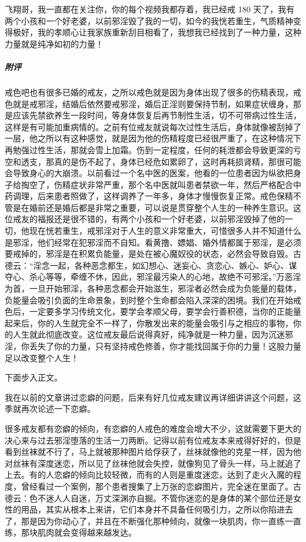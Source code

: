 \begin{case}
    飞翔哥，我一直都在关注你，你的每个视频我都存着，我已经戒 180 天了，我有两个小孩和一个好老婆，以前邪淫毁了我的一切，如今的我恍若重生，气质精神变得极好，我的孝顺心让我家族重新刮目相看了，我想我已经找到了一种力量，这种力量就是纯净如初的力量！
    \subparagraph{附评} 戒色吧也有很多已婚的戒友，之所以戒色就是因为身体出现了很多的伤精表现，戒色就是戒邪淫，结婚后依然要戒邪淫，婚后正淫则要保持节制，如果症状缠身，那是应该先禁欲养生一段时间，等身体恢复后再节制性生活，切不可带病过性生活，这样是有可能加重病情的。之前有位戒友就说每次过性生活后，身体就像被刮掉了一层，他之所以有这种感觉，就是因为他的伤精程度已经很严重了，在这种情况下再勉强过性生活，那就会雪上加霜。伤到一定程度，任何的耗泄都会导致更深的亏空和透支，那真的是伤不起了，身体已经危如累卵了，这时再耗损肾精，那很可能会导致身心的大崩溃。以前看过一个名中医的医案，他看的一位患者因为纵欲把身子给掏空了，伤精症状非常严重，那个名中医就叫患者禁欲一年，然后严格配合中药调理，后来患者照做了，这样调养了一年多，身体才慢慢恢复正常。戒色保精不管是在婚前还是婚后都是非常之重要，可以说是贯穿整个人生的一种养生意识。这位戒友的福报还是很不错的，有两个小孩和一个好老婆，以前邪淫毁掉了他的一切，他现在恍若重生，戒邪淫对于人生的意义非常重大，可惜很多人并不知道什么是邪淫，他们经常在犯邪淫而不自知。看黄撸、嫖娼、婚外情都属于邪淫，是必须要戒掉的，邪淫是在积累负能量，是处在被心魔奴役的状态，必然会导致自毁。古德云：“淫念一起，各种恶念都生，如幻想心、迷妄心、贪恋心、嫉心、妒心、谋夺心、杀心等等，牵缠不休，因此，邪淫最污染人的心地，故绝不可邪淫。”万恶淫为首，一旦开始邪淫，各种恶念都会开始滋生，邪淫者必然会成为负能量的载体，负能量会吸引负面的生命景象，到时整个生命都会陷入深深的困境。我们在开始戒色后，一定要多学习传统文化，要学会孝顺父母，要学会行善积德，当你的正能量起来后，你的人生就完全不一样了，你散发出来的能量会吸引与之相应的事物，你的人生就此彻底改变。这位戒友最后说得真好，纯净就是一种力量，因为沉迷邪淫，你丢失了你的力量，只有坚持戒色修善，你才能找回属于你的力量！这股力量足以改变整个人生！
\end{case}

下面步入正文。

我在以前的文章讲过恋癖的问题，后来有好几位戒友建议再详细讲讲这个问题，这季就再次论述一下恋癖。

很多戒友都有恋癖的倾向，有恋癖的人戒色的难度会增大不少，这就需要下更大的决心来与过去邪淫堕落的生活一刀两断。记得以前有位戒友本来戒得好好的，但是看到丝袜就不行了，马上就被那种图片给俘获了，丝袜就像他的克星一样，因为他对丝袜有深度迷恋，所以见了丝袜他就会失控，就像狗见了骨头一样，马上就追了上去。有的人恋癖的倾向比较轻微，而有的人则是重度迷恋，达到了走火入魔的程度，曾经看过一个案例，那个患者搜集了上万张的恋癖图片，完全迷在里面了。古德云：色不迷人人自迷，万丈深渊亦自掘。不管你迷恋的是身体的某个部位还是女性的用品，其实从根本上来讲，它们本身并不具备任何吸引力，之所以你陷进去了，那是因为你动心了，并且在不断强化那种倾向，就像一块肌肉，你一直练一直练，那块肌肉就会变得越来越发达。

